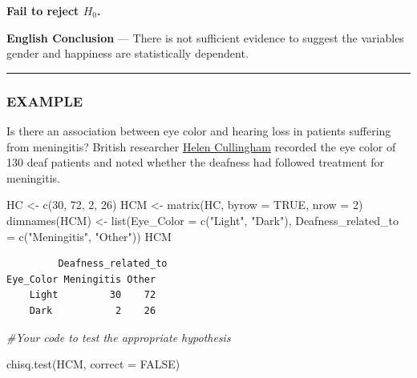 \documentclass[
]{article}
\newenvironment{Shaded}{\begin{snugshade}}{\end{snugshade}}
\newcommand{\AttributeTok}[1]{\textcolor[rgb]{0.77,0.63,0.00}{#1}}
\newcommand{\CommentTok}[1]{\textcolor[rgb]{0.56,0.35,0.01}{\textit{#1}}}
\newcommand{\ConstantTok}[1]{\textcolor[rgb]{0.00,0.00,0.00}{#1}}
\newcommand{\DecValTok}[1]{\textcolor[rgb]{0.00,0.00,0.81}{#1}}
\newcommand{\FunctionTok}[1]{\textcolor[rgb]{0.00,0.00,0.00}{#1}}
\newcommand{\NormalTok}[1]{#1}
\newcommand{\OtherTok}[1]{\textcolor[rgb]{0.56,0.35,0.01}{#1}}
\newcommand{\StringTok}[1]{\textcolor[rgb]{0.31,0.60,0.02}{#1}}
\begin{document}
\textbf{Fail to reject \(H_0\).}

\textbf{English Conclusion} --- There is not sufficient evidence to suggest the variables gender and happiness are statistically dependent.

\begin{center}\rule{0.5\linewidth}{0.5pt}\end{center}

\hypertarget{example-2}{%
\subsubsection*{EXAMPLE}\label{example-2}}

Is there an association between eye color and hearing loss in patients suffering from meningitis? British researcher \href{}{Helen Cullingham} recorded the eye color of 130 deaf patients and noted whether the deafness had followed treatment for meningitis.

\begin{Shaded}
\begin{Highlighting}[]
\NormalTok{HC }\OtherTok{\textless{}{-}} \FunctionTok{c}\NormalTok{(}\DecValTok{30}\NormalTok{, }\DecValTok{72}\NormalTok{, }\DecValTok{2}\NormalTok{, }\DecValTok{26}\NormalTok{)}
\NormalTok{HCM }\OtherTok{\textless{}{-}} \FunctionTok{matrix}\NormalTok{(HC, }\AttributeTok{byrow =} \ConstantTok{TRUE}\NormalTok{, }\AttributeTok{nrow =} \DecValTok{2}\NormalTok{)}
\FunctionTok{dimnames}\NormalTok{(HCM) }\OtherTok{\textless{}{-}} \FunctionTok{list}\NormalTok{(}\AttributeTok{Eye\_Color =} \FunctionTok{c}\NormalTok{(}\StringTok{"Light"}\NormalTok{, }\StringTok{"Dark"}\NormalTok{), }\AttributeTok{Deafness\_related\_to =} \FunctionTok{c}\NormalTok{(}\StringTok{"Meningitis"}\NormalTok{, }\StringTok{"Other"}\NormalTok{))}
\NormalTok{HCM}
\end{Highlighting}
\end{Shaded}

\begin{verbatim}
         Deafness_related_to
Eye_Color Meningitis Other
    Light         30    72
    Dark           2    26
\end{verbatim}

\begin{Shaded}
\begin{Highlighting}[]
\CommentTok{\#Your code to test the appropriate hypothesis}

\FunctionTok{chisq.test}\NormalTok{(HCM, }\AttributeTok{correct =} \ConstantTok{FALSE}\NormalTok{)}
\end{Highlighting}
\end{Shaded}
\end{document}
